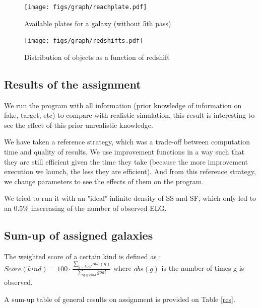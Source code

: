 \documentclass{article}
\begin{document}
\begin{figure}[H]\begin{center}
	\texttt{[image: figs/graph/reachplate.pdf]}
	\caption{Available plates for a galaxy (without 5th pass)}\label{reachplate}
\end{center}\end{figure}

\begin{figure}[H]\begin{center}
	\texttt{[image: figs/graph/redshifts.pdf]}
	\caption{Distribution of objects as a function of redshift}\label{redshifts}
\end{center}\end{figure}

\subsection{Results of the assignment}
We run the program with all information (prior knowledge of information on fake, target, etc) to compare with realistic simulation, this result is interesting to see the effect of this prior unrealistic knowledge.

We have taken a reference strategy, which was a trade-off between computation time and quality of results. We use improvement functions in a way such that they are still efficient given the time they take (because the more improvement execution we launch, the less they are efficient). And from this reference strategy, we change parameters to see the effects of them on the program.

We tried to run it with an "ideal" infinite density of SS and SF, which only led to an 0.5\% inscreasing of the number of observed ELG.

\subsection{Sum-up of assigned galaxies}
The weighted score of a certain kind is defined as : 
\vspace{1\baselineskip}
$Score(kind) = 100\cdot \frac{\sum\limits_{g \in kind} obs(g)}{\sum\limits_{g \in kind} goal}$ where $obs(g)$ is the number of times g is observed.

A sum-up table of general results on assignment is provided on Table \ref{res}.
\end{document}
